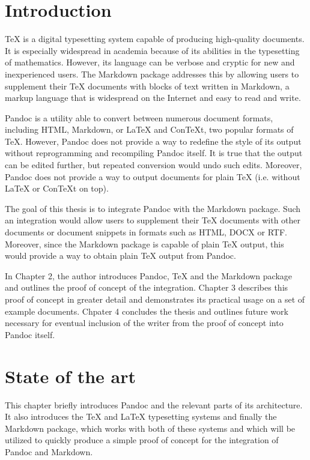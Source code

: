\documentclass[
  digital,     %
  oneside,     %
  nosansbold,  %
  nocolorbold, %
  lof,         %
  nolot,       %
]{fithesis4}
\begin{document}

\chapter{Introduction}
\TeX{} is a digital typesetting system capable of producing high-quality documents. It is especially widespread in academia because of its abilities in the typesetting of mathematics. However, its language can be verbose and cryptic for new and inexperienced users. The Markdown package addresses this by allowing users to supplement their \TeX{} documents with blocks of text written in Markdown, a markup language that is widespread on the Internet and easy to read and write.

Pandoc is a utility able to convert between numerous document formats, including HTML, Markdown, or \LaTeX{} and Con\TeX{}t, two popular formats of \TeX{}. However, Pandoc does not provide a way to redefine the style of its output without reprogramming and recompiling Pandoc itself. It is true that the output can be edited further, but repeated conversion would undo such edits. Moreover, Pandoc does not provide a way to output documents for plain \TeX{} (i.e. without \LaTeX{} or Con\TeX{}t on top).

The goal of this thesis is to integrate Pandoc with the Markdown package. Such an integration would allow users to supplement their \TeX{} documents with other documents or document snippets in formats such as HTML, DOCX or RTF. Moreover, since the Markdown package is capable of plain \TeX{} output, this would provide a way to obtain plain \TeX{} output from Pandoc.

In Chapter 2, the author introduces Pandoc, \TeX{} and the Markdown package and outlines the proof of concept of the integration. Chapter 3 describes this proof of concept in greater detail and demonstrates its practical usage on a set of example documents. Chpater 4 concludes the thesis and outlines future work necessary for eventual inclusion of the writer from the proof of concept into Pandoc itself.

\chapter{State of the art}
This chapter briefly introduces Pandoc and the relevant parts of its architecture. It also introduces the \TeX{} and \LaTeX{} typesetting systems and finally the Markdown package, which works with both of these systems and which will be utilized to quickly produce a simple proof of concept for the integration of Pandoc and Markdown.
\end{document}
